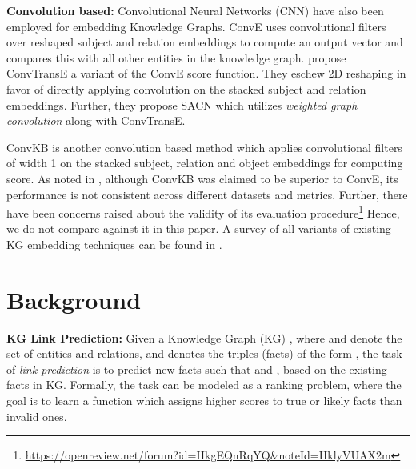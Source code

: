 \documentclass[11pt,a4paper]{article}
\begin{document}
\noindent \textbf{Convolution based:} Convolutional Neural Networks (CNN) have also been employed for embedding Knowledge Graphs. ConvE \cite{conve} uses convolutional filters over reshaped subject and relation embeddings to compute an output vector and compares this with all other entities in the knowledge graph.
\citeauthor{sacn_paper} propose ConvTransE a variant of the ConvE score function. They eschew 2D reshaping in favor of directly applying convolution on the stacked subject and relation embeddings. Further, they propose SACN which utilizes \textit{weighted graph convolution} along with ConvTransE.



ConvKB \cite{convkb} is another convolution based method which 
applies convolutional filters of width 1 on the stacked subject, relation and object embeddings for computing score. As noted in \cite{sacn_paper}, although ConvKB was claimed to be superior to ConvE, its performance is not consistent across different datasets and metrics. Further, there have been concerns raised about the validity of its evaluation procedure\footnote{\url{https://openreview.net/forum?id=HkgEQnRqYQ&noteId=HklyVUAX2m}} Hence, we do not compare against it in this paper.
A survey of all variants of existing KG embedding techniques can be found in \cite{survey2016nickel,survey2017}.


%
 

\section{Background}
\label{sec:background}
\noindent \textbf{KG Link Prediction:} Given a Knowledge Graph (KG) , where  and  denote the set of entities and relations, and  denotes the triples (facts) of the form , the task of \textit{link prediction} is to predict new facts  such that  and , based on the existing facts in KG. Formally, the task can be modeled as a ranking problem, where the goal is to learn a function  which assigns higher scores to true or likely facts  than invalid ones. 
\end{document}
